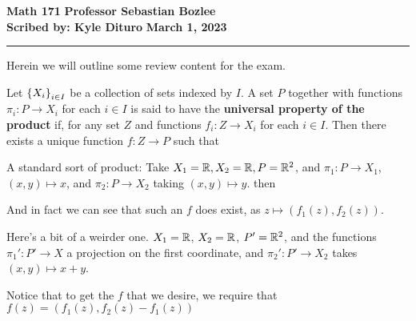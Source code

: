 \documentclass[12pt, twosided]{article}
\begin{document}
\noindent \textbf{Math 171} \hfill \textbf{Professor Sebastian Bozlee} \\
\textbf{Scribed by: Kyle Dituro} \hfill \textbf{March 1, 2023}\hrule
\vspace{.2in}

Herein we will outline some review content for the exam.

\begin{df}
  Let \(\left\{ X_i \right\}_{i \in I}\) be a collection of sets indexed by \(I\). A set \(P\) together with functions \(\pi_i: P \to X_i\) for each \(i \in I\) is said to have the \textbf{universal property of the product} if, for any set \(Z\) and functions \(f_i: Z \to X_i\) for each \(i \in I\). Then there exists a unique function \(f: Z \to P\) such that
  \begin{center}
  \end{center}
\end{df}

\begin{exa}
  A standard sort of product: Take \(X_1 = \mathbb{R}, X_2 = \mathbb{R}, P = \mathbb{R}^2\), and \(\pi_1: P \to X_1\), \((x, y) \mapsto x\), and \(\pi_2: P \to X_2\) taking \((x, y) \mapsto y\). then

  \begin{center}
  \end{center}
  And in fact we can see that such an \(f\) does exist, as \(z \mapsto (f_1(z), f_2(z))\).
\end{exa}

\begin{exa}
  Here's a bit of a weirder one.
  \(X_1 = \mathbb{R}\), \(X_2 = \mathbb{R}\), \(P\prime = \R^2\), and the functions \(\pi_1\prime: P\prime \to X\) a projection on the first coordinate, and \(\pi_2\prime: P\prime \to X_2\) takes \((x, y) \mapsto x + y\).

  \begin{center}
  \end{center}
  Notice that to get the \(f\) that we desire, we require that \(f(z) = (f_1(z), f_2(z) - f_1(z))\)
\end{exa}
\end{document}
